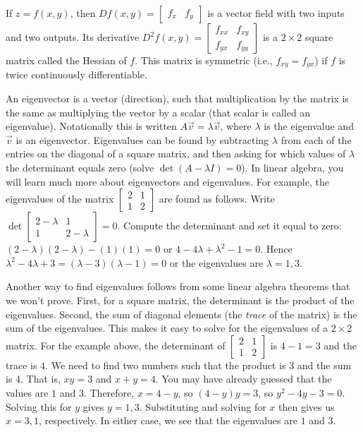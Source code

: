 If {$z=f(x,y)$}, then $Df(x,y) = \begin{bmatrix}f_x&f_y\end{bmatrix}$
is a vector field with two inputs and two outputs. Its derivative
{$D^2f (x,y)= \begin{bmatrix}f_{xx}&f_{xy}\\f_{yx}&f_{yy}\end{bmatrix}
  $} is a {$2\times 2$} square matrix called the Hessian of $f$. This
matrix is symmetric (i.e., $f_{xy}=f_{yx}$) if $f$ is twice
continuously differentiable.

An eigenvector is a vector (direction), such that multiplication by
the matrix is the same as multiplying the vector by a scalar (that
scalar is called an eigenvalue). Notationally this is written {$ A\vec
v=\lambda \vec v $}, where {$ \lambda $} is the eigenvalue and $\vec v$ is an
eigenvector. Eigenvalues can be found by subtracting {$\lambda$} from each
of the entries on the diagonal of a square matrix, and then asking for
which values of {$\lambda$} the determinant equals zero (solve {$ \det(A-\lambda I)
= 0 $}). In linear algebra, you will learn much more about
eigenvectors and eigenvalues. For example, the eigenvalues of the
matrix {$ \begin{bmatrix}2&1 \\1&2\end{bmatrix} $} are found as
follows. Write {$ \det \begin{bmatrix}2-\lambda&1 \\1&2-\lambda\end{bmatrix} =0$}.
Compute the determinant and set it equal to zero: {$(2-\lambda)(2-\lambda)-(1)(1) = 0$} or {$4-4\lambda + \lambda^2 -1 = 0$}. Hence
{$\lambda^2-4\lambda +3 = (\lambda-3)(\lambda -1) = 0$} or the eigenvalues are {$\lambda = 1,3$}. 

Another way to find eigenvalues follows from some linear algebra
theorems that we won't prove.  First, for a square matrix, the
determinant is the product of the eigenvalues.  Second, the sum of
diagonal elements (the \emph{trace} of the matrix) is the sum of the
eigenvalues.  This makes it easy to solve for the eigenvalues of a $2\times
2$ matrix.  For the example above, the determinant of $
\begin{bmatrix}
  2&1\\1&2
\end{bmatrix}$ is $4-1=3$ and the trace is $4$.  We need to find two
numbers such that the product is 3 and the sum is 4.  That is, $xy=3$
and $x+y=4$.  You may have already guessed that the values are $1$ and
$3$.  Therefore, $x=4-y$, so $(4-y)y=3$, so $y^2-4y-3=0$.  Solving
this for $y$ gives $y=1,3$.  Substituting and solving for $x$ then
gives us $x=3,1$, respectively.  In either case, we see that the
eigenvalues are $1$ and $3$.


